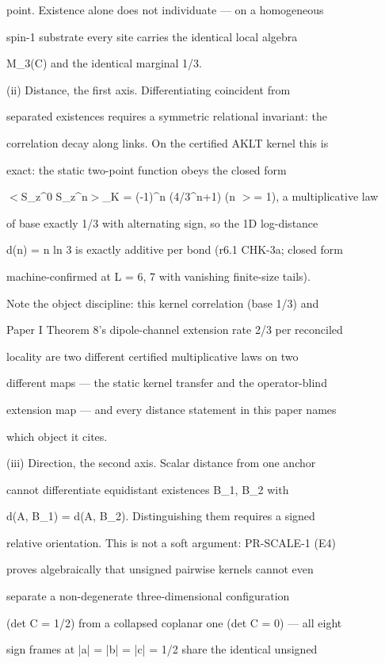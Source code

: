 \documentclass[11pt,a4paper]{article}
\theoremstyle{definition}
\begin{document}
point. Existence alone does not individuate — on a homogeneous

spin-1 substrate every site carries the identical local algebra

M\_3(C) and the identical marginal 1/3.


(ii) Distance, the first axis. Differentiating coincident from

separated existences requires a symmetric relational invariant: the

correlation decay along links. On the certified AKLT kernel this is

exact: the static two-point function obeys the closed form

$<$S\_z\^{}0 S\_z\^{}n$>$\_K = (-1)\^{}n (4/3\^{}{n+1}) (n $>$= 1), a multiplicative law

of base exactly 1/3 with alternating sign, so the 1D log-distance

d(n) = n ln 3 is exactly additive per bond (r6.1 CHK-3a; closed form

machine-confirmed at L = 6, 7 with vanishing finite-size tails).

Note the object discipline: this kernel correlation (base 1/3) and

Paper I Theorem 8's dipole-channel extension rate 2/3 per reconciled

locality are two different certified multiplicative laws on two

different maps — the static kernel transfer and the operator-blind

extension map — and every distance statement in this paper names

which object it cites.


(iii) Direction, the second axis. Scalar distance from one anchor

cannot differentiate equidistant existences B\_1, B\_2 with

d(A, B\_1) = d(A, B\_2). Distinguishing them requires a signed

relative orientation. This is not a soft argument: PR-SCALE-1 (E4)

proves algebraically that unsigned pairwise kernels cannot even

separate a non-degenerate three-dimensional configuration

(det C = 1/2) from a collapsed coplanar one (det C = 0) — all eight

sign frames at |a| = |b| = |c| = 1/2 share the identical unsigned
\end{document}
